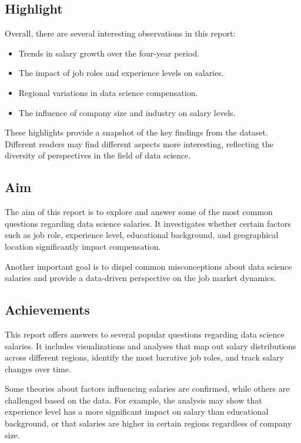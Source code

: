 \documentclass{article}\usepackage[]{graphicx}\usepackage[]{xcolor}
\begin{document}
\subsection{Highlight}
Overall, there are several interesting observations in this report:
\begin{itemize}
    \item Trends in salary growth over the four-year period.
    \item The impact of job roles and experience levels on salaries.
    \item Regional variations in data science compensation.
    \item The influence of company size and industry on salary levels.
\end{itemize}

These highlights provide a snapshot of the key findings from the dataset. Different readers may find different aspects more interesting, reflecting the diversity of perspectives in the field of data science.

\subsection{Aim}
The aim of this report is to explore and answer some of the most common questions regarding data science salaries. It investigates whether certain factors such as job role, experience level, educational background, and geographical location significantly impact compensation.

Another important goal is to dispel common misconceptions about data science salaries and provide a data-driven perspective on the job market dynamics.

\subsection{Achievements}
This report offers answers to several popular questions regarding data science salaries. It includes visualizations and analyses that map out salary distributions across different regions, identify the most lucrative job roles, and track salary changes over time.

Some theories about factors influencing salaries are confirmed, while others are challenged based on the data. For example, the analysis may show that experience level has a more significant impact on salary than educational background, or that salaries are higher in certain regions regardless of company size.
\end{document}
